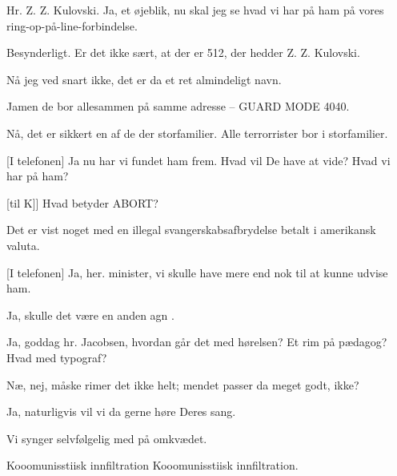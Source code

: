 \documentclass[a4paper,11pt]{article}
\begin{document}
\begin{sketch}
 Hr. Z. Z. Kulovski. Ja, et øjeblik, nu skal jeg se hvad vi har på ham
på vores ring-op-på-line-forbindelse.


 Besynderligt. Er det ikke sært, at der er 512, der hedder
Z. Z. Kulovski.

 Nå jeg ved snart ikke, det er da et ret almindeligt navn.

 Jamen de bor allesammen på samme adresse -- GUARD MODE 4040.

 Nå, det er sikkert en af de der storfamilier. Alle terrorrister bor i
storfamilier.

[I telefonen] Ja nu har vi fundet ham frem. Hvad vil De have at vide?
Hvad vi har på ham?

[til K]] Hvad betyder ABORT?

 Det er vist noget med en illegal svangerskabsafbrydelse betalt i
amerikansk valuta.

[I telefonen] Ja, her. minister, vi skulle have mere end nok til at
kunne udvise ham.

 Ja, skulle det være en anden agn .



 Ja, goddag hr. Jacobsen, hvordan går det med hørelsen? Et rim på
pædagog? Hvad med typograf?

 Næ, nej, måske rimer det ikke helt; mendet passer da meget godt, ikke?

 Ja, naturligvis vil vi da gerne høre Deres sang. 

 Vi synger selvfølgelig med på omkvædet.

\end{sketch}

\begin{song}

Kooomunisstiisk innfiltration
Kooomunisstiisk innfiltration.

\end{song}
\end{document}
